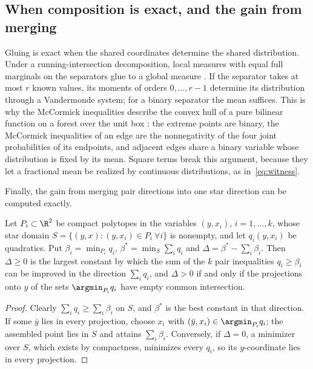 \subsection{When composition is exact, and the gain from merging}\label{sec:gluing}

Gluing is exact when the shared coordinates determine the shared
distribution. Under a running-intersection decomposition, local measures
with equal full marginals on the separators glue to a global measure
\citep{Vorobev1962,Lasserre2006}. If the separator takes at most $r$
known values, its moments of orders $0,\dots,r-1$ determine its
distribution through a Vandermonde system; for a binary separator the mean
suffices. This is why the McCormick inequalities describe the convex hull
of a pure bilinear function on a forest over the unit box
\citep[Proposition~8]{Padberg1989}: the extreme points are binary, the
McCormick inequalities of an edge are the nonnegativity of the four joint
probabilities of its endpoints, and adjacent edges share a binary variable
whose distribution is fixed by its mean. Square terms break this argument,
because they let a fractional mean be realized by continuous
distributions, as in~\eqref{eq:witness}.

Finally, the gain from merging pair directions into one star direction
can be computed exactly.

\begin{corollary}\label{cor:gain}
Let $P_i\subset\R^2$ be compact polytopes in the variables $(y,x_i)$,
$i=1,\dots,k$, whose star domain $S=\{(y,x):(y,x_i)\in P_i\ \forall i\}$ is
nonempty, and let $q_i(y,x_i)$ be quadratics. Put $\beta_i=\min_{P_i}q_i$,
$\beta^\ast=\min_S\sum_iq_i$ and $\Delta=\beta^\ast-\sum_i\beta_i$. Then
$\Delta\ge0$ is the largest constant by which the sum of the $k$ pair
inequalities $q_i\ge\beta_i$ can be improved in the direction $\sum_iq_i$,
and $\Delta>0$ if and only if the projections onto $y$ of the sets
$\argmin_{P_i}q_i$ have empty common intersection.
\end{corollary}

\begin{proof}
Clearly $\sum_iq_i\ge\sum_i\beta_i$ on $S$, and $\beta^\ast$ is the best
constant in that direction. If some $\bar y$ lies in every projection,
choose $x_i$ with $(\bar y,x_i)\in\argmin_{P_i}q_i$; the assembled point
lies in $S$ and attains $\sum_i\beta_i$. Conversely, if $\Delta=0$, a
minimizer over $S$, which exists by compactness, minimizes every $q_i$,
so its $y$-coordinate lies in every projection.
\end{proof}

